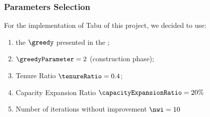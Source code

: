 \subsubsection{Parameters Selection}

For the implementation of Tabu of this project, we decided to use:

\begin{enumerate}
    \item the \greedyCriteriaText $\greedy$ presented in the ;
    \item \greedyParameterText $\greedyParameter = 2$ (construction phase);
    \item Tenure Ratio $\tenureRatio = 0.4$;
    \item Capacity Expansion Ratio $\capacityExpansionRatio = 20\%$
    \item Number of iterations without improvement $\nwi = 10$
\end{enumerate}
